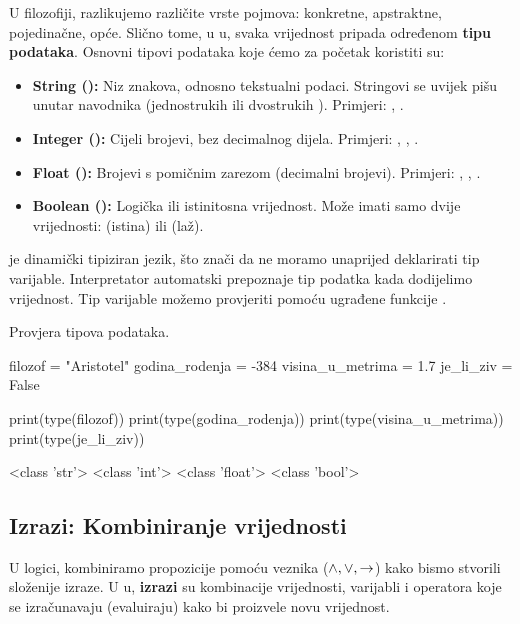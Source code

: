 U filozofiji, razlikujemo različite vrste pojmova: konkretne, apstraktne, pojedinačne, opće. Slično tome, u u, svaka vrijednost pripada određenom \textbf{tipu podataka}. Osnovni tipovi podataka koje ćemo za početak koristiti su:
\begin{itemize}[leftmargin=*]
    \item \textbf{String ():} Niz znakova, odnosno tekstualni podaci. Stringovi se uvijek pišu unutar navodnika (jednostrukih  ili dvostrukih ). Primjeri: , .
    \item \textbf{Integer ():} Cijeli brojevi, bez decimalnog dijela. Primjeri: , , .
    \item \textbf{Float ():} Brojevi s pomičnim zarezom (decimalni brojevi). Primjeri: , , .
    \item \textbf{Boolean ():} Logička ili istinitosna vrijednost. Može imati samo dvije vrijednosti:  (istina) ili  (laž).
\end{itemize}

 je dinamički tipiziran jezik, što znači da ne moramo unaprijed deklarirati tip varijable. Interpretator automatski prepoznaje tip podatka kada dodijelimo vrijednost. Tip varijable možemo provjeriti pomoću ugrađene funkcije .

\begin{primjerokvir}
    Provjera tipova podataka.
    \begin{pythoncode}
filozof = "Aristotel"
godina_rodenja = -384
visina_u_metrima = 1.7
je_li_ziv = False

print(type(filozof))
print(type(godina_rodenja))
print(type(visina_u_metrima))
print(type(je_li_ziv))
    \end{pythoncode}
    \begin{codeoutput}
<class 'str'>
<class 'int'>
<class 'float'>
<class 'bool'>
    \end{codeoutput}
\end{primjerokvir}

\subsection{Izrazi: Kombiniranje vrijednosti}

U logici, kombiniramo propozicije pomoću veznika ($\land, \lor, \rightarrow$) kako bismo stvorili složenije izraze. U u, \textbf{izrazi} su kombinacije vrijednosti, varijabli i operatora koje se izračunavaju (evaluiraju) kako bi proizvele novu vrijednost.

